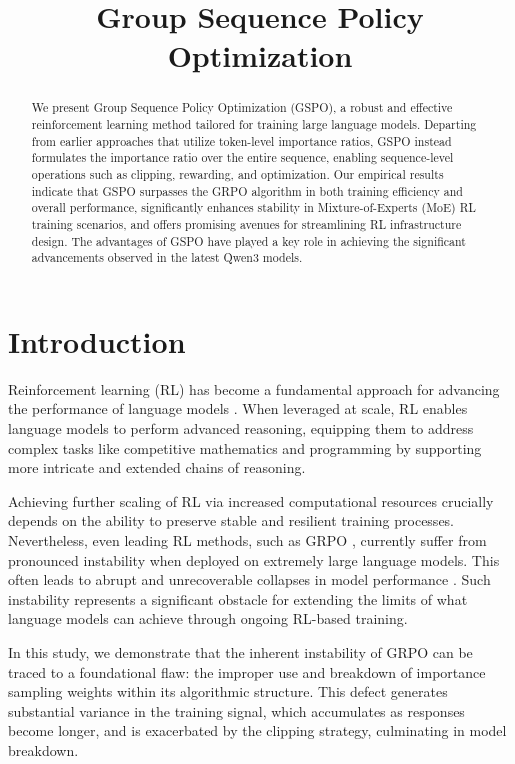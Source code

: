 \title{Group Sequence Policy Optimization}

\begin{abstract}
We present Group Sequence Policy Optimization (GSPO), a robust and effective reinforcement learning method tailored for training large language models. Departing from earlier approaches that utilize token-level importance ratios, GSPO instead formulates the importance ratio over the entire sequence, enabling sequence-level operations such as clipping, rewarding, and optimization. Our empirical results indicate that GSPO surpasses the GRPO algorithm in both training efficiency and overall performance, significantly enhances stability in Mixture-of-Experts (MoE) RL training scenarios, and offers promising avenues for streamlining RL infrastructure design. The advantages of GSPO have played a key role in achieving the significant advancements observed in the latest Qwen3 models.
\end{abstract}

\section{Introduction}
\label{sec:intro}

Reinforcement learning (RL) has become a fundamental approach for advancing the performance of language models \citep{o1,dpsk-r1,qwq32b,qwen3}. When leveraged at scale, RL enables language models to perform advanced reasoning, equipping them to address complex tasks like competitive mathematics and programming by supporting more intricate and extended chains of reasoning.

Achieving further scaling of RL via increased computational resources crucially depends on the ability to preserve stable and resilient training processes. Nevertheless, even leading RL methods, such as GRPO \citep{grpo}, currently suffer from pronounced instability when deployed on extremely large language models. This often leads to abrupt and unrecoverable collapses in model performance \citep{qwen3, minimax-m1}. Such instability represents a significant obstacle for extending the limits of what language models can achieve through ongoing RL-based training.

In this study, we demonstrate that the inherent instability of GRPO can be traced to a foundational flaw: the improper use and breakdown of importance sampling weights within its algorithmic structure. This defect generates substantial variance in the training signal, which accumulates as responses become longer, and is exacerbated by the clipping strategy, culminating in model breakdown.

